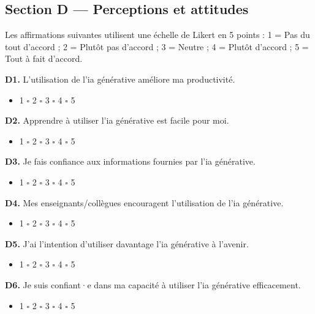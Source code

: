\medskip

\subsection{Section D — Perceptions et attitudes}

Les affirmations suivantes utilisent une échelle de Likert en 5 points : 1 = Pas du tout d'accord ; 2 = Plutôt pas d'accord ; 3 = Neutre ; 4 = Plutôt d'accord ; 5 = Tout à fait d'accord.

\textbf{D1.} L'utilisation de l'\gls{ia} générative améliore ma productivité.
\begin{itemize}[label=$\square$, leftmargin=1.5cm]
  \item 1 \quad $\square$ 2 \quad $\square$ 3 \quad $\square$ 4 \quad $\square$ 5
\end{itemize}

\textbf{D2.} Apprendre à utiliser l'\gls{ia} générative est facile pour moi.
\begin{itemize}[label=$\square$, leftmargin=1.5cm]
  \item 1 \quad $\square$ 2 \quad $\square$ 3 \quad $\square$ 4 \quad $\square$ 5
\end{itemize}

\textbf{D3.} Je fais confiance aux informations fournies par l'\gls{ia} générative.
\begin{itemize}[label=$\square$, leftmargin=1.5cm]
  \item 1 \quad $\square$ 2 \quad $\square$ 3 \quad $\square$ 4 \quad $\square$ 5
\end{itemize}

\textbf{D4.} Mes enseignants/collègues encouragent l'utilisation de l'\gls{ia} générative.
\begin{itemize}[label=$\square$, leftmargin=1.5cm]
  \item 1 \quad $\square$ 2 \quad $\square$ 3 \quad $\square$ 4 \quad $\square$ 5
\end{itemize}

\textbf{D5.} J'ai l'intention d'utiliser davantage l'\gls{ia} générative à l'avenir.
\begin{itemize}[label=$\square$, leftmargin=1.5cm]
  \item 1 \quad $\square$ 2 \quad $\square$ 3 \quad $\square$ 4 \quad $\square$ 5
\end{itemize}

\textbf{D6.} Je suis confiant·e dans ma capacité à utiliser l'\gls{ia} générative efficacement.
\begin{itemize}[label=$\square$, leftmargin=1.5cm]
  \item 1 \quad $\square$ 2 \quad $\square$ 3 \quad $\square$ 4 \quad $\square$ 5
\end{itemize}

